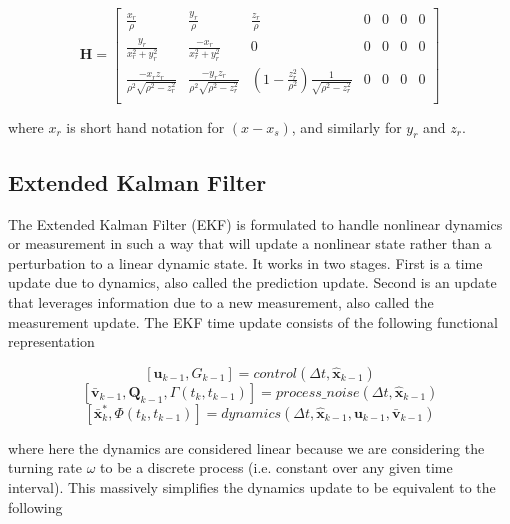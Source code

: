 \documentclass{article}
\begin{document}
\begin{equation}\label{eqn:measurement_jacobian}
	\mathbf{H} = 
	\begin{bmatrix}
		\frac{x_r}{\rho} & \frac{y_r}{\rho} & \frac{z_r}{\rho} & 0 & 0 & 0 & 0 \\
		\frac{y_r}{x_r^2 + y_r^2} & \frac{-x_r}{x_r^2 + y_r^2} & 0 & 0 & 0 & 0 & 0 \\
		\frac{-x_r z_r}{\rho^2 \sqrt{\rho^2 - z_r^2}} & \frac{-y_r z_r}{\rho^2 \sqrt{\rho^2 - z_r^2}} & (1-\frac{z_r^2}{\rho^2})\frac{1}{\sqrt{\rho^2 - z_r^2}} & 0 & 0 & 0 & 0 \\
	\end{bmatrix}
\end{equation}

where $x_r$ is short hand notation for $(x-x_s)$, and similarly for $y_r$ and $z_r$.

\subsection{Extended Kalman Filter}

The Extended Kalman Filter (EKF) is formulated to handle nonlinear dynamics or measurement in such a way that will update a nonlinear state rather than a perturbation to a linear dynamic state. It works in two stages. First is a time update due to dynamics, also called the prediction update. Second is an update that leverages information due to a new measurement, also called the measurement update. The EKF time update consists of the following functional representation

\begin{equation}\label{eqn:update_control}
	[\mathbf{u}_{k-1}, G_{k-1}] = control(\Delta t, \hat{\mathbf{x}}_{k-1})
\end{equation}
\begin{equation}\label{eqn:update_process_noise}
	[\bar{\mathbf{v}}_{k-1}, \mathbf{Q}_{k-1}, \Gamma(t_k,t_{k-1})] = process\_noise(\Delta t, \hat{\mathbf{x}}_{k-1})
\end{equation}
\begin{equation}\label{eqn:update_dynamics}
	[\bar{\mathbf{x}}_k^*, \Phi(t_k,t_{k-1})] = dynamics(\Delta t, \hat{\mathbf{x}}_{k-1}, \mathbf{u}_{k-1}, \bar{\mathbf{v}}_{k-1})
\end{equation}

where here the dynamics are considered linear because we are considering the turning rate $\omega$ to be a discrete process (i.e. constant over any given time interval). This massively simplifies the dynamics update to be equivalent to the following
\end{document}
